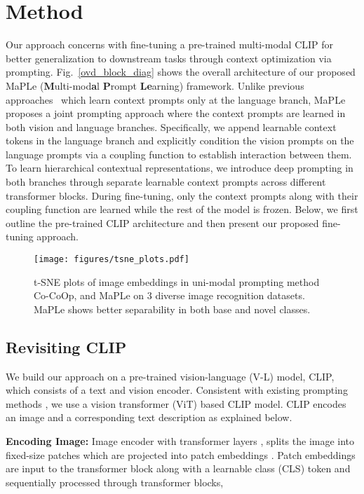\documentclass[10pt,twocolumn,letterpaper]{article}
\begin{document}
\section{Method}
\noindent Our approach concerns with fine-tuning a pre-trained multi-modal CLIP for better generalization to downstream tasks through context optimization via prompting. Fig.~\ref{ovd_block_diag} shows the overall architecture of our proposed MaPLe (\textbf{M}ulti-mod\textbf{a}l \textbf{P}rompt \textbf{Le}arning) framework.  Unlike previous approaches~\cite{zhou2022learning, zhou2022conditional} which learn context prompts only at the language branch, MaPLe proposes a joint prompting approach where the context prompts are learned in both vision and language branches. Specifically, we append learnable context tokens in the language branch and explicitly condition the vision prompts on the language prompts via a coupling function to establish interaction between them. To learn hierarchical contextual representations, we introduce deep prompting in both branches through separate learnable context prompts across different transformer blocks. During fine-tuning, only the context prompts along with their coupling function are learned while the rest of the model is frozen.
Below, we first outline the pre-trained CLIP architecture and then present our proposed fine-tuning approach.

\begin{figure*}[h!]
\centering
{\texttt{[image: figures/tsne\_plots.pdf]}}
\caption{\small t-SNE plots of image embeddings in uni-modal prompting method
Co-CoOp,
and MaPLe on 3 diverse image recognition datasets. MaPLe shows better separability in both base and novel classes.}  
\label{fig:tsne_plots}
\end{figure*}




\subsection{Revisiting CLIP}
\noindent We build our approach on a
pre-trained vision-language (V-L) model, CLIP, which consists of a text and vision encoder. Consistent with existing prompting methods \cite{zhou2022learning, zhou2022conditional}, we use a vision transformer (ViT) \cite{dosovitskiy2020image} based CLIP model. CLIP encodes an image  and a corresponding text description as explained below.

\noindent \textbf{Encoding Image:}
Image encoder  with  transformer layers , splits the image  into  fixed-size patches which are projected into patch embeddings .
Patch embeddings  are input to the  transformer block  along with a learnable class (CLS) token  and sequentially processed through  transformer blocks,
\end{document}
